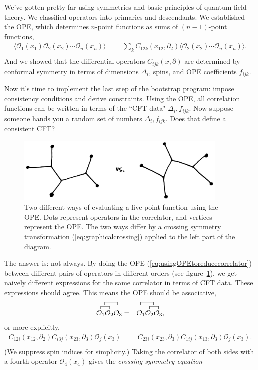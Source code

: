 \documentclass[11pt]{ws-rv9x6}
\newcommand\be{\begin{eqnarray}}
\newcommand\ee{\end{eqnarray}}
\newcommand\cO{\mathcal{O}}
\newcommand\ptl\partial
\newcommand\<\langle
\renewcommand\>\rangle
\newcommand\nn{\nonumber}
\renewcommand\.{\cdot}
\newcommand\De{\Delta}
\begin{document}
We've gotten pretty far using symmetries and basic principles of quantum field theory.  We  classified operators into primaries and descendants. We established the OPE, which determines $n$-point functions as sums of $(n-1)$-point functions,
\be
\label{eq:usingOPEtoreducecorrelator}
\<\cO_1(x_1)\cO_2(x_2)\cdots\cO_n(x_n)\> &=& \sum_k C_{12k}(x_{12},\ptl_2)\<\cO_2(x_2)\cdots\cO_n(x_n)\>.\nn\\
\ee
And we showed that the differential operators $C_{ijk}(x,\ptl)$ are determined by conformal symmetry in terms of dimensions $\De_i$, spins, and OPE coefficients $f_{ijk}$. 

Now it's time to implement the last step of the bootstrap program: impose consistency conditions and derive constraints.  Using the OPE, all correlation functions can be written in terms of the ``CFT data" $\De_i,f_{ijk}$.  Now suppose someone hands you a random set of numbers $\De_i,f_{ijk}$.  Does that define a consistent CFT?

\begin{figure}
\begin{center}
\includegraphics[width=0.9\textwidth]{opedifferentways.jpg}
\end{center}
\caption{Two different ways of evaluating a five-point function using the OPE\@.  Dots represent operators in the correlator, and vertices represent the OPE\@. The two ways differ by a crossing symmetry transformation (\ref{eq:graphicalcrossing}) applied to the left part of the diagram.\label{fig:opedifferentways}}
\end{figure}

The answer is: not always.  By doing the OPE (\ref{eq:usingOPEtoreducecorrelator}) between different pairs of operators in different orders (see figure~\ref{fig:opedifferentways}), we get naively different expressions for the same correlator in terms of CFT data.  These expressions should agree. 
This means the OPE should be associative,
\be
\contraction{}{
\frac 1 2\!\!\!\!\!
\cO_1\cO_2
}{}{\cO_3}
\contraction{}{\cO_1}{}{\cO_2}
\cO_1\cO_2\cO_3
&=&
\contraction{}{
\frac 1 2\!\!\!\!\!
\cO_1
}{}{
\contraction{}{\cO_2}{}{\cO_3}
\cO_2\cO_3
}
\contraction{\cO_1}{\cO_2}{}{\cO_3}
\cO_1\cO_2\cO_3,
\ee
or more explicitly,
\be
\label{eq:OPEassociativity}
C_{12i}(x_{12},\ptl_2)C_{i3j}(x_{23},\ptl_3)\cO_j(x_3) &=& C_{23i}(x_{23},\ptl_3)C_{1ij}(x_{13},\ptl_3)\cO_j(x_3).\nn\\
\ee
(We suppress spin indices for simplicity.)
Taking the correlator of both sides with a fourth operator $\cO_4(x_4)$ gives the {\it crossing symmetry equation}
\end{document}

